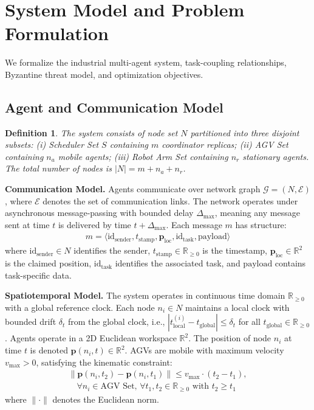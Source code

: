 \documentclass[lettersize,journal]{IEEEtran}
\newtheorem{definition}{Definition}
\begin{document}
\section{System Model and Problem Formulation}
\label{sec:model}

We formalize the industrial multi-agent system, task-coupling relationships, Byzantine threat model, and optimization objectives.

\subsection{Agent and Communication Model}
\label{sec:agent_com_model}

\begin{definition}
The system consists of node set $N$ partitioned into three disjoint subsets: 
(i) \textit{Scheduler Set} $S$ containing $m$ coordinator replicas; 
(ii) \textit{AGV Set} containing $n_a$ mobile agents; 
(iii) \textit{Robot Arm Set} containing $n_r$ stationary agents. 
The total number of nodes is $|N| = m + n_a + n_r$.
\end{definition}

\textbf{Communication Model.} Agents communicate over network graph $\mathcal{G} = (N, \mathcal{E})$, where $\mathcal{E}$ denotes the set of communication links. 
The network operates under asynchronous message-passing with bounded delay $\Delta_{\max}$, meaning any message sent at time $t$ is delivered by time $t + \Delta_{\max}$. 
Each message $m$ has structure:
\begin{equation}
\begin{aligned}
m = \langle \text{id}_{\text{sender}}, t_{\text{stamp}}, \mathbf{p}_{\text{loc}}, 
\text{id}_{\text{task}}, \text{payload} \rangle
\end{aligned}
\end{equation}
where $\text{id}_{\text{sender}} \in N$ identifies the sender, 
$t_{\text{stamp}} \in \mathbb{R}_{\geq 0}$ is the timestamp, 
$\mathbf{p}_{\text{loc}} \in \mathbb{R}^2$ is the claimed position, 
$\text{id}_{\text{task}}$ identifies the associated task, and 
$\text{payload}$ contains task-specific data.

\textbf{Spatiotemporal Model.} The system operates in continuous time domain $\mathbb{R}_{\geq 0}$ with a global reference clock. 
Each node $n_i \in N$ maintains a local clock with bounded drift $\delta_t$ from the global clock, i.e., $|t_{\text{local}}^{(i)} - t_{\text{global}}| 
\leq \delta_t$ for all $t_{\text{global}} \in \mathbb{R}_{\geq 0}$. 
Agents operate in a 2D Euclidean workspace $\mathbb{R}^2$. The position of node $n_i$ at time $t$ is denoted $\mathbf{p}(n_i, t) \in \mathbb{R}^2$. 
AGVs are mobile with maximum velocity $v_{\max} > 0$, satisfying the kinematic 
constraint:
\begin{equation}
\begin{aligned}
\|\mathbf{p}(n_i, t_2) - \mathbf{p}(n_i, t_1)\| \leq v_{\max} \cdot (t_2 - t_1), \\
\quad \forall n_i \in \text{AGV Set}, \, \forall t_1, t_2 \in \mathbb{R}_{\geq 0} 
\text{ with } t_2 \geq t_1
\end{aligned}
\end{equation}
where $\|\cdot\|$ denotes the Euclidean norm.
\end{document}
